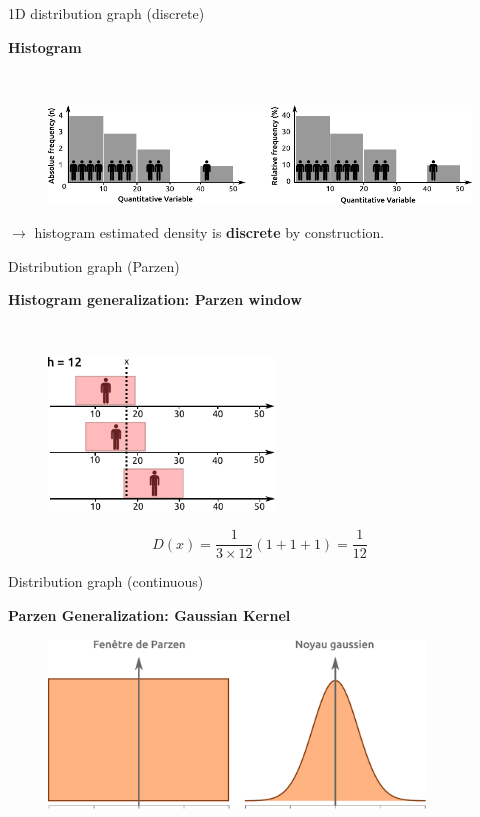 \begin{frame}{1D distribution graph (discrete)}

\textbf{Histogram}

~ 

\begin{figure}
\includegraphics[width=12cm]{Histogramme_EN.pdf}
\end{figure}

$\rightarrow$ histogram estimated density is \textbf{discrete} by construction.

\end{frame}



\begin{frame}{Distribution graph (Parzen)}

\textbf{Histogram generalization: Parzen window}

~ 

\begin{figure}
\includegraphics[width=6cm]{HistogrammeParzen.pdf}
\end{figure}

$$ D(x) = \frac{1}{3 \times 12} (1 + 1 + 1) = \frac{1}{12}$$

\end{frame}


\begin{frame}{Distribution graph (continuous)}

\textbf{Parzen Generalization: Gaussian Kernel}

\begin{figure}
\includegraphics[width=10cm]{Gauss.pdf}
\end{figure}

\end{frame}






